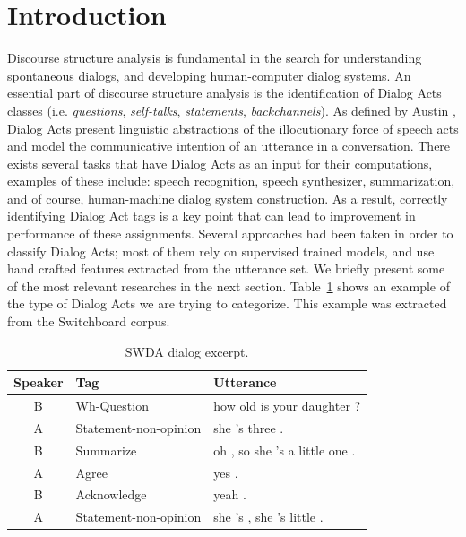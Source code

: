 \section{Introduction}\label{sec:intro}
Discourse structure analysis is fundamental in the search for understanding spontaneous dialogs, and developing human-computer dialog systems. An essential part of discourse structure analysis is the identification of Dialog Acts classes (i.e. \emph{questions}, \emph{self-talks}, \emph{statements}, \emph{backchannels}). As defined by Austin , Dialog Acts present linguistic abstractions of the illocutionary force of speech acts and model the communicative intention of an utterance in a conversation. There exists several tasks that have Dialog Acts as an input for their computations, examples of these include: speech recognition, speech synthesizer, summarization, and of course, human-machine dialog system construction. As a result, correctly identifying Dialog Act tags is a key point that can lead to improvement in performance of these assignments.
Several approaches had been taken in order to classify Dialog Acts; most of them rely on supervised trained models, and use hand crafted features extracted from the utterance set.  We briefly present some of the most relevant researches in the next section.
Table~\ref{tab:swda_example} shows an example of the type of Dialog Acts we are trying to categorize. This example was extracted from the Switchboard corpus.

\begin{table}[h]
\centering
\begin{tabular}{c l l}
\hline
\textbf{Speaker} & \textbf{Tag} & \textbf{Utterance}
\\
\hline
B & Wh-Question & how old is your daughter ?\\
A & Statement-non-opinion & she 's three .\\
B & Summarize & oh , so she 's a little one .\\
A & Agree & yes .\\
B & Acknowledge & yeah .\\
A & Statement-non-opinion & she 's , she 's little .\\
\hline
\end{tabular}
\caption{SWDA dialog excerpt.}
\label{tab:swda_example}
\end{table}

